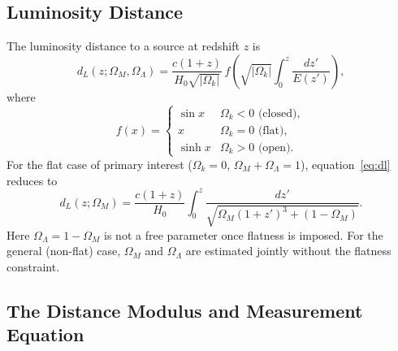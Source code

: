 \documentclass[12pt]{article}
\begin{document}
\subsection{Luminosity Distance}

The luminosity distance to a source at redshift $z$ is
\begin{equation}\label{eq:dl}
  d_L(z;\Omega_M,\Omega_\Lambda) =
  \frac{c(1+z)}{H_0\sqrt{|\Omega_k|}}
  \,f\!\left(\sqrt{|\Omega_k|}\int_0^z\frac{dz'}{E(z')}\right),
\end{equation}
where
\begin{equation}
  f(x) =
  \begin{cases}
    \sin x   & \Omega_k < 0 \text{ (closed)}, \\
    x         & \Omega_k = 0 \text{ (flat)}, \\
    \sinh x  & \Omega_k > 0 \text{ (open)}.
  \end{cases}
\end{equation}
For the flat case of primary interest ($\Omega_k = 0$, $\Omega_M +
\Omega_\Lambda = 1$), equation~\eqref{eq:dl} reduces to
\begin{equation}\label{eq:dl_flat}
  \boxed{d_L(z;\Omega_M) =
  \frac{c(1+z)}{H_0}\int_0^z\frac{dz'}
  {\sqrt{\Omega_M(1+z')^3 + (1-\Omega_M)}}.}
\end{equation}
Here $\Omega_\Lambda = 1 - \Omega_M$ is not a free parameter once flatness
is imposed.  For the general (non-flat) case, $\Omega_M$ and
$\Omega_\Lambda$ are estimated jointly without the flatness constraint.

\subsection{The Distance Modulus and Measurement Equation}
\end{document}
